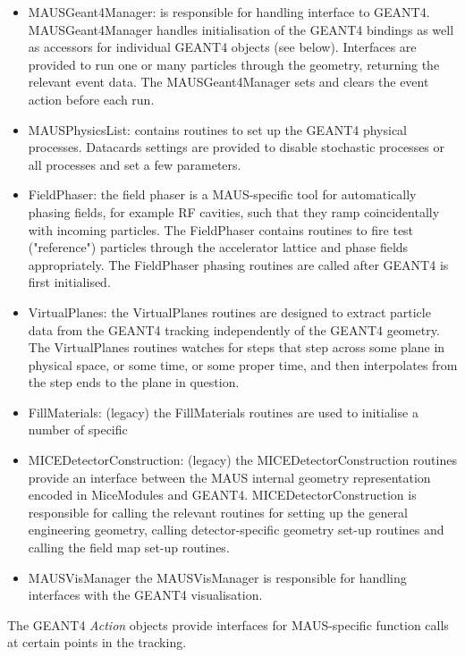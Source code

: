 \begin{itemize}
\item MAUSGeant4Manager: is responsible for handling interface to GEANT4. MAUSGeant4Manager handles initialisation of the GEANT4 bindings as well as accessors for individual GEANT4 objects (see below). Interfaces are provided to run one or many particles through the geometry, returning the relevant event data. The MAUSGeant4Manager sets and clears the event action before each run.
\item MAUSPhysicsList: contains routines to set up the GEANT4 physical processes. Datacards settings are provided to disable stochastic processes or all processes and set a few parameters.
\item FieldPhaser: the field phaser is a MAUS-specific tool for automatically phasing fields, for example RF cavities, such that they ramp coincidentally with incoming particles. The FieldPhaser contains routines to fire test ("reference") particles through the accelerator lattice and phase fields appropriately. The FieldPhaser phasing routines are called after GEANT4 is first initialised.
\item VirtualPlanes: the VirtualPlanes routines are designed to extract particle data from the GEANT4 tracking independently of the GEANT4 geometry. The VirtualPlanes routines watches for steps that step across some plane in physical space, or some time, or some proper time, and then interpolates from the step ends to the plane in question.
\item FillMaterials: (legacy) the FillMaterials routines are used to initialise a number of specific 
\item MICEDetectorConstruction: (legacy) the MICEDetectorConstruction routines provide an interface between the MAUS internal geometry representation encoded in MiceModules and GEANT4. MICEDetectorConstruction is responsible for calling the relevant routines for setting up the general engineering geometry, calling detector-specific geometry set-up routines and calling the field map set-up routines.
\item MAUSVisManager the MAUSVisManager is responsible for handling interfaces with the GEANT4 visualisation.
\end{itemize}

The GEANT4 \emph{Action} objects provide interfaces for MAUS-specific function calls at certain points in the tracking.

